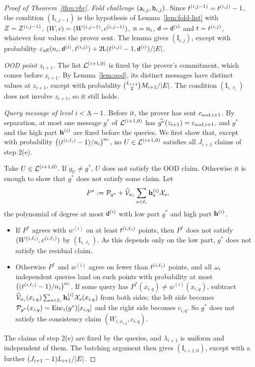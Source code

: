 \begin{proof}[Proof of Theorem~\ref{thm:rbr}]
\medskip\noindent\emph{Fold challenge $(\mathsf{a}_{i,j},\mathsf{b}_{i,j})$.} Since $t^{(i,j-1)}=t^{(i,j)}-1$, the condition $(\mathrm{I}_{i,j-1})$ is the hypothesis of Lemma~\ref{lem:fold-list} with $Z=Z^{(i,j-1)}$, $(W,c)=(W^{(i,j-1)},c^{(i,j-1)})$, $n=n_i$, $\mathsf{d}=\mathsf{d}^{(i)}$ and $t=t^{(i,j)}$, whatever four values the prover sent. The lemma gives $(\mathrm{I}_{i,j})$, except with probability $\varepsilon_{\mathrm{aff}}(n_i,\mathsf{d}^{(i)},t^{(i,j)})+2\mathsf{L}(t^{(i,j)}-1,\mathsf{d}^{(i)})/|E|$.

\medskip\noindent\emph{OOD point $z_{i+1}$.} The list $\mathcal{L}^{(i+1,0)}$ is fixed by the prover's commitment, which comes before $z_{i+1}$. By Lemma~\ref{lem:ood}, its distinct messages have distinct values at $z_{i+1}$, except with probability $\binom{L_{i+1}}{2}M_{i+1}/|E|$. The condition $(\mathrm{I}_{i,\ell_i})$ does not involve $z_{i+1}$, so it still holds.

\medskip\noindent\emph{Query message of level $i<\Lambda-1$.} Before it, the prover has sent $c_{\mathrm{ood},i+1}$. By separation, at most one message $g^\ast$ of $\mathcal{L}^{(i+1,0)}$ has $\widetilde{g^\ast}(z_{i+1})=c_{\mathrm{ood},i+1}$, and $g^\ast$ and the high part $\mathbf{h}^{(i)}$ are fixed before the queries. We first show that, except with probability $\bigl((t^{(i,\ell_i)}-1)/n_i\bigr)^{\omega_i}$, no $U\in\mathcal{L}^{(i+1,0)}$ satisfies all $J_{i+1}$ claims of step 2(e).

Take $U\in\mathcal{L}^{(i+1,0)}$. If $g_U\neq g^\ast$, $U$ does not satisfy the OOD claim. Otherwise it is enough to show that $g^\ast$ does not satisfy some claim. Let
\[
P^\ast:=\mathcal{P}_{g^\ast}+\widehat{\mathcal{V}}_{\kappa_i}\sum_{s<\ell_i}\mathbf{h}^{(i)}_s\mathcal{X}_s,
\]
the polynomial of degree at most $\mathsf{d}^{(i)}$ with low part $g^\ast$ and high part $\mathbf{h}^{(i)}$.
\begin{itemize}[itemsep=1pt]
\item If $P^\ast$ agrees with $w^{(i)}$ on at least $t^{(i,\ell_i)}$ points, then $P^\ast$ does not satisfy $(W^{(i,\ell_i)},c^{(i,\ell_i)})$ by $(\mathrm{I}_{i,\ell_i})$. As this depends only on the low part, $g^\ast$ does not satisfy the residual claim.
\item Otherwise $P^\ast$ and $w^{(i)}$ agree on fewer than $t^{(i,\ell_i)}$ points, and all $\omega_i$ independent queries land on such points with probability at most $\bigl((t^{(i,\ell_i)}-1)/n_i\bigr)^{\omega_i}$. If some query has $P^\ast(x_{i,q})\neq w^{(i)}(x_{i,q})$, subtract $\widehat{\mathcal{V}}_{\kappa_i}(x_{i,q})\sum_{s<\ell_i}\mathbf{h}^{(i)}_s\mathcal{X}_s(x_{i,q})$ from both sides: the left side becomes $\mathcal{P}_{g^\ast}(x_{i,q})=\mathrm{Enc}_i(g^\ast)[x_{i,q}]$ and the right side becomes $c_{i,q}$. So $g^\ast$ does not satisfy the consistency claim $(W_{i,x_{i,q}},c_{i,q})$.
\end{itemize}
The claims of step 2(e) are fixed by the queries, and $\lambda_{i+1}$ is uniform and independent of them. The batching argument then gives $(\mathrm{I}_{i+1,0})$, except with a further $(J_{i+1}-1)L_{i+1}/|E|$.


\end{proof}
